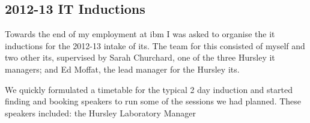 \documentclass[a4paper,11pt]{report}
\begin{document}
\subsection{2012-13 IT Inductions}

Towards the end of my employment at \gls{ibm} I was asked to organise the \gls{it} inductions for
the 2012-13 intake of \gls{it}s. The team for this consisted of myself and two other \gls{it}s, 
supervised by Sarah Churchard, one of the three Hursley \gls{it} managers; and Ed Moffat, the lead
manager for the Hursley \gls{it}s.

We quickly formulated a timetable for the typical 2 day induction and started finding and booking
speakers to run some of the sessions we had planned. These speakers included: the Hursley 
Laboratory Manager 
\end{document}
